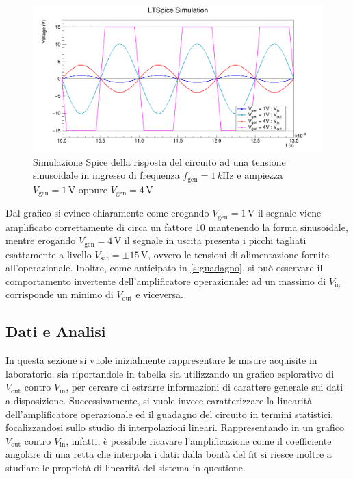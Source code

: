 \documentclass[a4paper,11pt]{article} %
\begin{document}
\begin{figure}[H]
	\centering
	\includegraphics[width=15cm]{../Plots/Report_Plots/opamp_spice_1V_4V.png}
	\caption{Simulazione Spice della risposta del circuito ad una tensione sinusoidale in ingresso di frequenza
	$f_{\text{gen}}=1\,\si{k\hertz}$ e ampiezza $V_{\text{gen}}=1\,\si{\volt}$ oppure $V_{\text{gen}}=4\,\si{\volt}$}
	\label{i:opamp_simulation}
\end{figure}

\noindent Dal grafico si evince chiaramente come erogando $V_{\text{gen}}=1\,\si{\volt}$ il segnale viene amplificato
correttamente di circa un fattore 10 mantenendo la forma sinusoidale, mentre erogando $V_{\text{gen}}=4\,\si{\volt}$ il
segnale in uscita presenta i picchi tagliati esattamente a livello $V_{\text{sat}}=\pm 15\,\si{\volt}$, ovvero le
tensioni di alimentazione fornite all'operazionale. Inoltre, come anticipato in \autoref{s:guadagno}, si può osservare
il comportamento invertente dell'amplificatore operazionale: ad un massimo di $V_{\text{in}}$ corrisponde un minimo di
$V_{\text{out}}$ e viceversa.\\



\subsection{Dati e Analisi}
In questa sezione si vuole inizialmente rappresentare le misure acquisite in laboratorio, sia riportandole in tabella
sia utilizzando un grafico esplorativo di $V_{\text{out}}$ contro $V_{\text{in}}$, per cercare di estrarre informazioni
di carattere generale sui dati a disposizione. Successivamente, si vuole invece caratterizzare la linearità
dell'amplificatore operazionale ed il guadagno del circuito in termini statistici, focalizzandosi sullo studio di interpolazioni
lineari. Rappresentando in un grafico $V_{\text{out}}$ contro $V_{\text{in}}$, infatti, è possibile ricavare
l'amplificazione come il coefficiente angolare di una retta che interpola i dati: dalla bontà del fit si riesce inoltre a
studiare le proprietà di linearità del sistema in questione.
\end{document}

